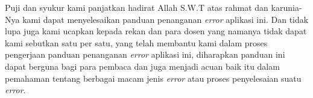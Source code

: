 \begin{acknowledgements}
Puji dan syukur kami panjatkan hadirat Allah S.W.T atas rahmat dan karunia-Nya kami dapat menyelesaikan panduan penanganan \textit{error} aplikasi ini.
Dan tidak lupa juga kami ucapkan kepada rekan dan para dosen yang namanya tidak dapat kami sebutkan satu per satu, yang telah membantu kami dalam proses pengerjaan panduan penanganan \textit{error} aplikasi ini, diharapkan panduan ini dapat berguna bagi para pembaca dan juga menjadi acuan baik itu dalam pemahaman tentang berbagai macam jenis \textit{error} atau proses penyelesaian suatu \textit{error}.
\end{acknowledgements}